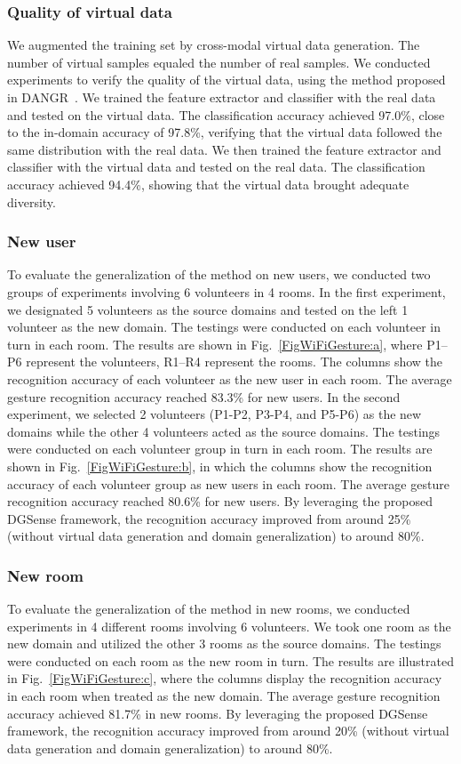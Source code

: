 \documentclass[journal]{IEEEtran}
\begin{document}
\subsubsection{Quality of virtual data}
We augmented the training set by cross-modal virtual data generation. The number of virtual samples equaled the number of real samples. We conducted experiments to verify the quality of the virtual data, using the method proposed in DANGR~\cite{HanZ:2020}. We trained the feature extractor and classifier with the real data and tested on the virtual data. The classification accuracy achieved 97.0\%, close to the in-domain accuracy of 97.8\%, verifying that the virtual data followed the same distribution with the real data. We then trained the feature extractor and classifier with the virtual data and tested on the real data. The classification accuracy achieved 94.4\%, showing that the virtual data brought adequate diversity.

\subsubsection{New user}
To evaluate the generalization of the method on new users, we conducted two groups of experiments involving 6 volunteers in 4 rooms. In the first experiment, we designated 5 volunteers as the source domains and tested on the left 1 volunteer as the new domain. The testings were conducted on each volunteer in turn in each room. The results are shown in Fig.~\ref{FigWiFiGesture:a}, where P1--P6 represent the volunteers, R1--R4 represent the rooms. The columns show the recognition accuracy of each volunteer as the new user in each room. The average gesture recognition accuracy reached 83.3\% for new users. In the second experiment, we selected 2 volunteers (P1-P2, P3-P4, and P5-P6) as the new domains while the other 4 volunteers acted as the source domains. The testings were conducted on each volunteer group in turn in each room. The results are shown in Fig.~\ref{FigWiFiGesture:b}, in which the columns show the recognition accuracy of each volunteer group as new users in each room. The average gesture recognition accuracy reached 80.6\% for new users. By leveraging the proposed DGSense framework, the recognition accuracy improved from around 25\% (without virtual data generation and domain generalization) to around 80\%.

\subsubsection{New room}
To evaluate the generalization of the method in new rooms, we conducted experiments in 4 different rooms involving 6 volunteers. We took one room as the new domain and utilized the other 3 rooms as the source domains. The testings were conducted on each room as the new room in turn. The results are illustrated in Fig.~\ref{FigWiFiGesture:c}, where the columns display the recognition accuracy in each room when treated as the new domain. The average gesture recognition accuracy achieved 81.7\% in new rooms. By leveraging the proposed DGSense framework, the recognition accuracy improved from around 20\% (without virtual data generation and domain generalization) to around 80\%.
\end{document}
